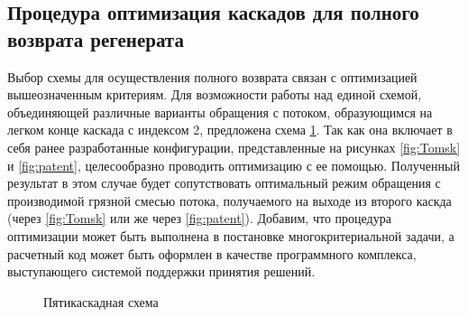 \subsection{Процедура оптимизация каскадов для полного возврата регенерата}\label{sec:ch2/sec2.2}
Выбор схемы для осуществления полного возврата связан с оптимизацией вышеозначенным критериям. Для возможности работы над единой схемой, объединяющей различные варианты обращения с потоком, образующимся на легком конце каскада с индексом 2, предложена схема \ref{fig:Total scheme}. Так как она включает в себя ранее разработанные конфигурации, представленные на рисунках \ref{fig:Tomsk} и \ref{fig:patent}, целесообразно проводить оптимизацию с ее помощью. Полученный результат в этом случае будет сопутствовать оптимальный режим обращения с производимой грязной смесью потока, получаемого на выходе из второго каскда (через \ref{fig:Tomsk} или же через \ref{fig:patent}).
Добавим, что процедура оптимизации может быть выполнена в постановке многокритериальной задачи, а расчетный код может быть оформлен в качестве программного комплекса, выступающего системой поддержки принятия решений.

\begin{figure}[ht]
  \caption{Пятикаскадная схема}\label{fig:Total scheme}
\end{figure}

